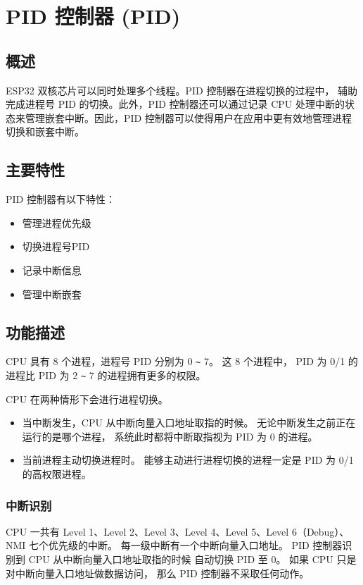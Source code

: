 \documentclass[main\_\_CN.tex]{subfiles}
\begin{document}
\hypertarget{pidctrl}{}
\chapter{PID 控制器 (PID)}
\label{mod:pid}

\section{概述}
ESP32 双核芯片可以同时处理多个线程。PID 控制器在进程切换的过程中，
辅助完成进程号 PID 的切换。此外，PID 控制器还可以通过记录 CPU 处理中断的状态来管理嵌套中断。因此，PID 控制器可以使得用户在应用中更有效地管理进程切换和嵌套中断。

\section{主要特性}
PID 控制器有以下特性：
\begin{itemize}
    \item 管理进程优先级
    \item 切换进程号PID
    \item 记录中断信息
    \item 管理中断嵌套
\end{itemize}

\section{功能描述}
CPU 具有 8 个进程，进程号 PID 分别为 0 \verb+~+ 7。
这 8 个进程中，
PID 为 0/1 的进程比 PID 为 2 \verb+~+ 7 的进程拥有更多的权限。

CPU 在两种情形下会进行进程切换。
\begin{itemize}
    \item 当中断发生，CPU 从中断向量入口地址取指的时候。
无论中断发生之前正在运行的是哪个进程，
系统此时都将中断取指视为 PID 为 0 的进程。
  \item 当前进程主动切换进程时。
能够主动进行进程切换的进程一定是 PID 为 0/1 的高权限进程。
\end{itemize}

\subsection{中断识别}

CPU 一共有
Level 1、Level 2、Level 3、Level 4、Level 5、Level 6（Debug）、NMI
七个优先级的中断。
每一级中断有一个中断向量入口地址。
PID 控制器识别到 CPU 从中断向量入口地址取指的时候
自动切换 PID 至 0。
如果 CPU 只是对中断向量入口地址做数据访问，
那么 PID 控制器不采取任何动作。
\end{document}
